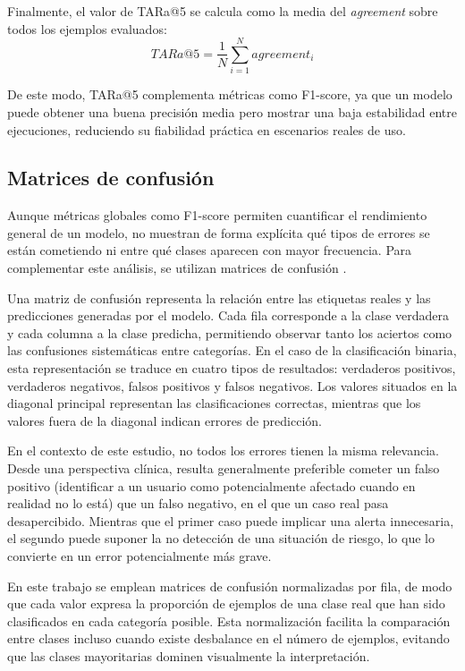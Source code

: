 Finalmente, el valor de \ac{TARa@5} se calcula como la media del \textit{agreement} sobre todos los ejemplos evaluados:
\[
TARa@5 =
\frac{1}{N}
\sum_{i=1}^{N}
agreement_i
\]

De este modo, \ac{TARa@5} complementa métricas como F1-score, ya que un modelo puede obtener una buena precisión media pero mostrar una baja estabilidad entre ejecuciones, reduciendo su fiabilidad práctica en escenarios reales de uso.

\subsection{Matrices de confusión}

Aunque métricas globales como F1-score permiten cuantificar el rendimiento general de un modelo, no muestran de forma explícita qué tipos de errores se están cometiendo ni entre qué clases aparecen con mayor frecuencia. Para complementar este análisis, se utilizan matrices de confusión \cite{powers_evaluation_2020}.

Una matriz de confusión representa la relación entre las etiquetas reales y las predicciones generadas por el modelo. Cada fila corresponde a la clase verdadera y cada columna a la clase predicha, permitiendo observar tanto los aciertos como las confusiones sistemáticas entre categorías. En el caso de la clasificación binaria, esta representación se traduce en cuatro tipos de resultados: verdaderos positivos, verdaderos negativos, falsos positivos y falsos negativos. Los valores situados en la diagonal principal representan las clasificaciones correctas, mientras que los valores fuera de la diagonal indican errores de predicción.

En el contexto de este estudio, no todos los errores tienen la misma relevancia. Desde una perspectiva clínica, resulta generalmente preferible cometer un falso positivo (identificar a un usuario como potencialmente afectado cuando en realidad no lo está) que un falso negativo, en el que un caso real pasa desapercibido. Mientras que el primer caso puede implicar una alerta innecesaria, el segundo puede suponer la no detección de una situación de riesgo, lo que lo convierte en un error potencialmente más grave.

En este trabajo se emplean matrices de confusión normalizadas por fila, de modo que cada valor expresa la proporción de ejemplos de una clase real que han sido clasificados en cada categoría posible. Esta normalización facilita la comparación entre clases incluso cuando existe desbalance en el número de ejemplos, evitando que las clases mayoritarias dominen visualmente la interpretación.

